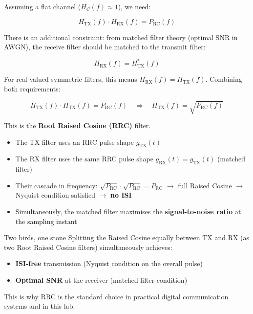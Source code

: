 Assuming a flat channel ($H_C(f) \approx 1$), we need:

\begin{equation}
H_{\text{TX}}(f) \cdot H_{\text{RX}}(f) = P_{\text{RC}}(f)
\end{equation}

There is an additional constraint: from matched filter theory (optimal SNR in AWGN), the receive filter should be matched to the transmit filter:

\begin{equation}
H_{\text{RX}}(f) = H_{\text{TX}}^*(f)
\end{equation}

For real-valued symmetric filters, this means $H_{\text{RX}}(f) = H_{\text{TX}}(f)$. Combining both requirements:

\begin{equation}
H_{\text{TX}}(f) \cdot H_{\text{TX}}(f) = P_{\text{RC}}(f) \quad\Longrightarrow\quad H_{\text{TX}}(f) = \sqrt{P_{\text{RC}}(f)}
\end{equation}

This is the \textbf{Root Raised Cosine (RRC)} filter.

\begin{itemize}
\item The TX filter uses an RRC pulse shape $g_{\text{TX}}(t)$
\item The RX filter uses the same RRC pulse shape $g_{\text{RX}}(t) = g_{\text{TX}}(t)$ (matched filter)
\item Their cascade in frequency: $\sqrt{P_{\text{RC}}} \cdot \sqrt{P_{\text{RC}}} = P_{\text{RC}}$ $\rightarrow$ full Raised Cosine $\rightarrow$ Nyquist condition satisfied $\rightarrow$ \textbf{no ISI}
\item Simultaneously, the matched filter maximises the \textbf{signal-to-noise ratio} at the sampling instant
\end{itemize}

\begin{KeyBox}{Two birds, one stone}
Splitting the Raised Cosine equally between TX and RX (as two Root Raised Cosine filters) simultaneously achieves:
\begin{itemize}
\item \textbf{ISI-free} transmission (Nyquist condition on the overall pulse)
\item \textbf{Optimal SNR} at the receiver (matched filter condition)
\end{itemize}
This is why RRC is the standard choice in practical digital communication systems and in this lab.
\end{KeyBox}

